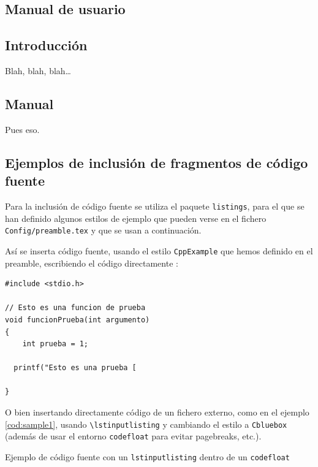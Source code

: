 \documentclass[spanish,openright]{book}
\begin{document}
\begin{appendices}
  


\chapter{Manual de usuario}
\label{cha:manual-de-usuario}

\section{Introducción}
\label{sec:intro-manual-de-usuario}

Blah, blah, blah\ldots


\section{Manual}
\label{sec:sec-manual-de-usuario}

Pues eso.


\section{Ejemplos de inclusión de fragmentos de código fuente}
\label{sec:codigo-fuente}

Para la inclusión de código fuente se utiliza el paquete
\texttt{listings}, para el que se han definido algunos estilos de
ejemplo que pueden verse en el fichero \texttt{Config/preamble.tex} y
que se usan a continuación.

Así se inserta código fuente, usando el estilo \texttt{CppExample} que
hemos definido en el preamble, escribiendo el código directamente :

\begin{lstlisting}[style=CppExample]
#include <stdio.h>

// Esto es una funcion de prueba
void funcionPrueba(int argumento)
{	
	int prueba = 1;

  printf("Esto es una prueba [

}
\end{lstlisting}

O bien insertando directamente código de un fichero externo, como en el
ejemplo \ref{cod:sample1}, usando
\texttt{\textbackslash{}lstinputlisting} y cambiando el estilo a
\texttt{Cbluebox} (además de usar el entorno \texttt{codefloat} para
evitar pagebreaks, etc.).

\begin{codefloat}

\caption{Ejemplo de código fuente con un \texttt{lstinputlisting} dentro
de un \texttt{codefloat}}
\label{cod:sample1}
\end{codefloat}



\end{appendices}
\end{document}
